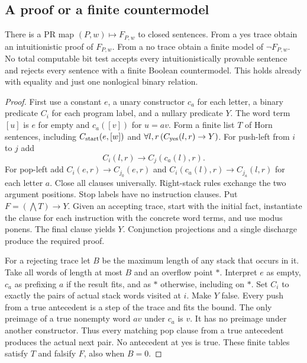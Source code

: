 \subsection{A proof or a finite countermodel}
\begin{theorem}\label{thm:church}
There is a PR map $(P,w)\mapsto F_{P,w}$ to closed sentences. From a yes trace obtain an intuitionistic proof of $F_{P,w}$. From a no trace obtain a finite model of $\neg F_{P,w}$. No total computable bit test accepts every intuitionistically provable sentence and rejects every sentence with a finite Boolean countermodel. This holds already with equality and just one nonlogical binary relation.
\end{theorem}
\begin{proof}
First use a constant $e$, a unary constructor $c_a$ for each letter, a binary predicate $C_i$ for each program label, and a nullary predicate $Y$. The word term $[u]$ is $e$ for empty and $c_a([v])$ for $u=av$. Form a finite list $T$ of Horn sentences, including $C_{\rm start}(e,[w])$ and $\forall l,r\,(C_{\rm yes}(l,r)\to Y)$. For push-left from $i$ to $j$ add
\[
             C_i(l,r)\to C_j(c_a(l),r).
\]
For pop-left add $C_i(e,r)\to C_{j_0}(e,r)$ and
$C_i(c_a(l),r)\to C_{j_a}(l,r)$ for each letter $a$. Close all clauses universally. Right-stack rules exchange the two argument positions. Stop labels have no instruction clauses. Put $F=(\bigwedge T)\to Y$. Given an accepting trace, start with the initial fact, instantiate the clause for each instruction with the concrete word terms, and use modus ponens. The final clause yields $Y$. Conjunction projections and a single discharge produce the required proof.

For a rejecting trace let $B$ be the maximum length of any stack that occurs in it. Take all words of length at most $B$ and an overflow point $*$. Interpret $e$ as empty, $c_a$ as prefixing $a$ if the result fits, and as $*$ otherwise, including on $*$. Set $C_i$ to exactly the pairs of actual stack words visited at $i$. Make $Y$ false. Every push from a true antecedent is a step of the trace and fits the bound. The only preimage of a true nonempty word $av$ under $c_a$ is $v$. It has no preimage under another constructor. Thus every matching pop clause from a true antecedent produces the actual next pair. No antecedent at yes is true. These finite tables satisfy $T$ and falsify $F$, also when $B=0$.


\end{proof}
